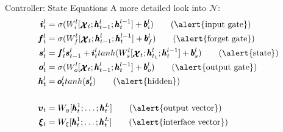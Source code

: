 \documentclass{beamer}
\newcommand{\xx}{\pmb{\raisebox{-1.5pt}{$\mathcal{X}$}}}
\newcommand{\hh}{\pmb{h}}
\newcommand{\ii}{\pmb{i}}
\newcommand{\oo}{\pmb{o}}
\newcommand{\ff}{\pmb{f}}
\newcommand{\Ss}{\pmb{s}}
\newcommand{\bb}{\pmb{b}}
\begin{document}
\begin{frame}{Controller: State Equations}
	A more detailed look into $\mathcal{N}$:\\
	\begin{align}
	\ii_t^l &= \sigma(W_i^l[\xx_t;\hh_{t-1}^l;\hh_t^{l-1}]+\bb_i^l)   \tag{\alert{input gate}}\\
	\ff_t^l &= \sigma(W_f^l[\xx_t;\hh_{t-1}^l;\hh_t^{l-1}]+\bb_f^l)	\tag{\alert{forget gate}}\\
	\Ss_t^l &= \ff_t^l\Ss_{t-1}^l + \ii_t^ltanh(W_s^l[\xx_t;\hh_{t_1}^l;\hh_t^{l-1}] + \bb_s^l)		\tag{\alert{state}}\\
	\oo_t^l &= \sigma(W_o^l[\xx_t;\hh_{t-1}^l;\hh_t^{l-1}]+\bb_o^l)		\tag{\alert{output gate}}\\
	\hh_t^l &= \oo_t^ltanh(\Ss_t^l)		\tag{\alert{hidden}}\\
	\nonumber \\ 
	\pmb{\upsilon}_t &= W_y[\hh_t^1;\dots;\hh_t^L]		\tag{\alert{output vector}}\\
	\pmb{\xi}_t &= W_{\xi}[\hh_t^1;\dots;\hh_t^L]		\tag{\alert{interface vector}}
	\end{align}
\end{frame}
\end{document}
